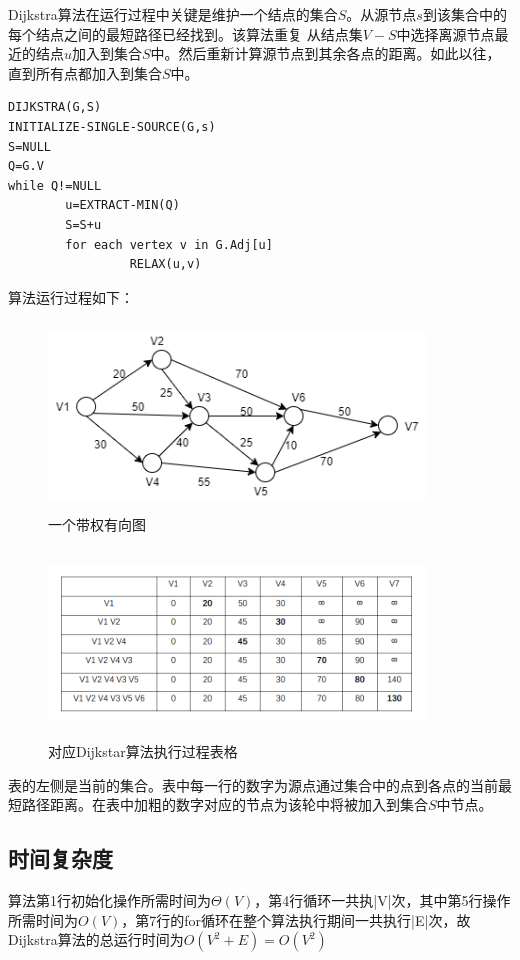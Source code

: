 Dijkstra算法在运行过程中关键是维护一个结点的集合$S$。从源节点$s$到该集合中的每个结点之间的最短路径已经找到。该算法重复
从结点集$V-S$中选择离源节点最近的结点$u$加入到集合$S$中。然后重新计算源节点到其余各点的距离。如此以往，直到所有点都加入到集合$S$中。

\begin{lstlisting}[caption=Dijkstra算法伪代码]
DIJKSTRA(G,S)
INITIALIZE-SINGLE-SOURCE(G,s)
S=NULL
Q=G.V
while Q!=NULL
        u=EXTRACT-MIN(Q)
		S=S+u
		for each vertex v in G.Adj[u]
		         RELAX(u,v)

\end{lstlisting}

算法运行过程如下：

\begin{figure}
\centering
\includegraphics[width=10cm,height=5cm]{image/dijkstra1.png}
\caption{一个带权有向图}
\end{figure}
\begin{figure}
\centering
\includegraphics[width=10cm,height=5cm]{image/dijkstra2.png}
\caption{对应Dijkstar算法执行过程表格}
\end{figure}

表的左侧是当前的集合。表中每一行的数字为源点通过集合中的点到各点的当前最短路径距离。在表中加粗的数字对应的节点为该轮中将被加入到集合$S$中节点。

\subsection{时间复杂度}
算法第1行初始化操作所需时间为$\Theta(V)$，第4行循环一共执|V|次，其中第5行操作所需时间为$O(V)$，第7行的for循环在整个算法执行期间一共执行|E|次，故Dijkstra算法的总运行时间为$O(V^2+E)=O(V^2)$

